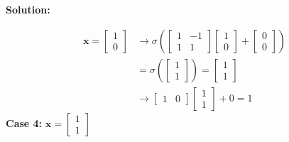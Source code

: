 \documentclass{article}
\newenvironment{solution}
  {\par\noindent\textbf{Solution:}\par}
  {\par}
\begin{document}
\begin{solution}
\[
\begin{aligned}
\mathbf{x}= \begin{bmatrix}
1 \\
0
\end{bmatrix} &\to \sigma(\begin{bmatrix}
1 & -1  \\
1 & 1
\end{bmatrix}\begin{bmatrix}
1 \\
0
\end{bmatrix} + \begin{bmatrix}
0 \\
0
\end{bmatrix}) \\
&= \sigma(\begin{bmatrix}
1  \\
1
\end{bmatrix}) = \begin{bmatrix}
1 \\
1
\end{bmatrix} \\ 
&\to \begin{bmatrix}
1 & 0
\end{bmatrix}\begin{bmatrix}
1 \\
1
\end{bmatrix}+0 = 1
\end{aligned}
\]
\textbf{Case 4:} $\mathbf{x}= \begin{bmatrix}
1 \\
1
\end{bmatrix}$


\end{solution}
\end{document}
